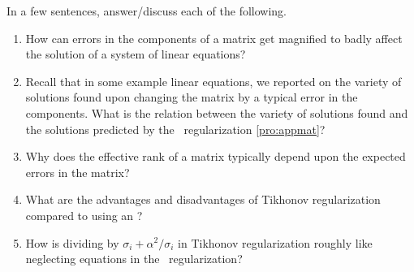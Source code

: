 \begin{exercise} 
In a few sentences, answer\slash discuss each of the following.
\begin{enumerate}
\item  How can errors in the components of a matrix get magnified to badly affect the solution of a system of linear equations?

\item Recall that in some example linear equations, we reported on the variety of solutions found upon changing the matrix by a typical error in the components. 
What is the relation between the variety of solutions found and the solutions predicted by the \svd\ regularization \cref{pro:appmat}?

\item Why does the effective rank of a matrix typically depend upon the expected errors in the matrix?

\item What are the advantages and disadvantages of Tikhonov regularization compared to using an \svd?

\item How is dividing by \(\sigma_i+\alpha^2/\sigma_i\) in Tikhonov regularization roughly like neglecting equations in the \svd\ regularization?

\end{enumerate}
\end{exercise}


\begin{comment}%
why, what caused X?
how did X occur?
what-if? what-if-not?
how does X compare with Y?
what is the evidence for X?
why is X important?
\end{comment}






\begin{comment}
Possible extensions of this chapter include Frobenius norm.  
Possibly link to polar decomposition (Higham86) 
see closestOrthogonalMatrix.png

\begin{exercise}  
Prove that for every square matrix~\(A\) with \svd\ \(A=\usv\), a closest \idx{orthogonal matrix} to~\(A\) is~\(U\tr V\) ??
Related to the Kabsch algorithm??
\begin{center}
\TwoD1101
\TwoD{0.89443}{0.44721}{0.44721}{1.34164}%
\TwoD{0.89443}{0.44721}{-0.44721}{0.89443}%
\end{center}
\end{exercise}
\end{comment}


